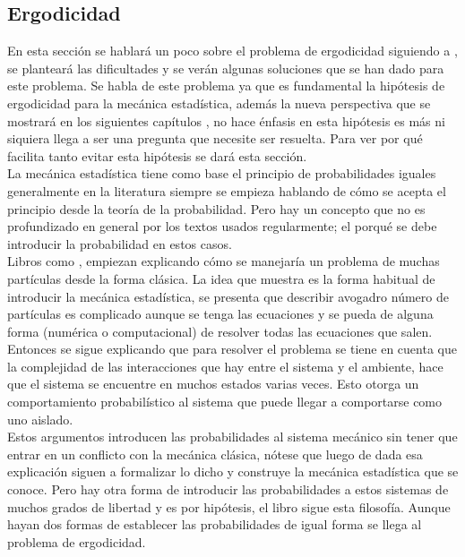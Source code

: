 \subsection{Ergodicidad}
En esta sección se hablará un poco sobre el problema de ergodicidad siguiendo a \cite{TodaStat}, se planteará las dificultades y se verán algunas soluciones que se han dado para este problema. Se habla de este problema ya que es fundamental la hipótesis de ergodicidad para la mecánica estadística, además la nueva perspectiva que se mostrará en los siguientes capítulos \cite{Popescu2006}, no hace énfasis en esta hipótesis es más ni siquiera llega a ser una pregunta que necesite ser resuelta. Para ver por qué facilita tanto evitar esta hipótesis se dará esta sección.
\\
La mecánica estadística tiene como base el principio de probabilidades iguales generalmente en la literatura siempre se empieza hablando de cómo se acepta el principio desde la teoría de la probabilidad. Pero hay un concepto que no es profundizado en general por los textos usados regularmente; el porqué se debe introducir la probabilidad en estos casos.\\
Libros como \cite{HuangStat},\cite{LandauStat} empiezan explicando cómo se manejaría un problema de muchas partículas desde la forma clásica. La idea que muestra es la forma habitual de introducir la mecánica estadística, se presenta que describir avogadro número de partículas es complicado aunque se  tenga las ecuaciones y se pueda de alguna forma (numérica o computacional) de resolver todas las ecuaciones que salen. Entonces se sigue explicando que para resolver el problema se tiene en cuenta que la complejidad de las	 interacciones que hay entre el sistema y el ambiente, hace que el sistema se encuentre en muchos estados varias veces. Esto otorga un comportamiento probabilístico al sistema que puede llegar a comportarse como uno aislado.
\\ 
Estos argumentos introducen las probabilidades al sistema mecánico sin tener que entrar en un conflicto con la mecánica clásica, nótese que luego de dada esa explicación siguen a formalizar lo dicho y construye la mecánica estadística que se conoce. Pero hay otra forma de introducir las probabilidades a estos sistemas de muchos grados de libertad y es por hipótesis, el libro \cite{KhinchinStat} sigue esta filosofía. Aunque hayan dos formas de establecer las probabilidades de igual forma se llega al problema de ergodicidad. 
\\
